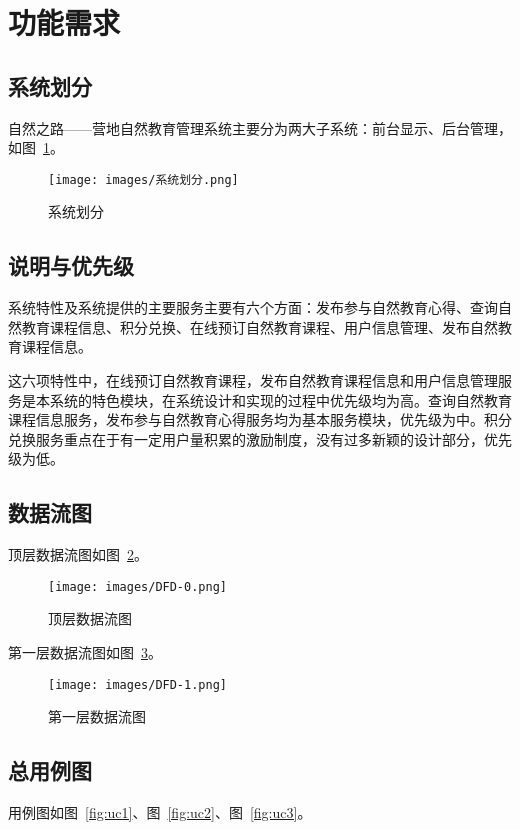 \section{功能需求}
\subsection{系统划分}
自然之路——营地自然教育管理系统主要分为两大子系统：前台显示、后台管理，如图~\ref{fig:系统划分}。

\begin{figure}[H]
 \centering
 \texttt{[image: images/系统划分.png]}
 \caption{
    系统划分
 }
 \label{fig:系统划分}
 \vspace{-\medskipamount}
\end{figure}

\subsection{说明与优先级}
系统特性及系统提供的主要服务主要有六个方面：发布参与自然教育心得、查询自然教育课程信息、积分兑换、在线预订自然教育课程、用户信息管理、发布自然教育课程信息。

这六项特性中，在线预订自然教育课程，发布自然教育课程信息和用户信息管理服务是本系统的特色模块，在系统设计和实现的过程中优先级均为高。查询自然教育课程信息服务，发布参与自然教育心得服务均为基本服务模块，优先级为中。积分兑换服务重点在于有一定用户量积累的激励制度，没有过多新颖的设计部分，优先级为低。

\subsection{数据流图}
顶层数据流图如图~\ref{fig:DFD0}。

\begin{figure}[H]
 \centering
 \texttt{[image: images/DFD-0.png]}
 \caption{
    顶层数据流图
  }
 \label{fig:DFD0}
 \vspace{-\medskipamount}
\end{figure}

第一层数据流图如图~\ref{fig:DFD1}。

\begin{figure}[H]
 \centering
 \texttt{[image: images/DFD-1.png]}
 \caption{
    第一层数据流图
  }
 \label{fig:DFD1}
 \vspace{-\medskipamount}
\end{figure}

\subsection{总用例图}
用例图如图~\ref{fig:uc1}、图~\ref{fig:uc2}、图~\ref{fig:uc3}。

